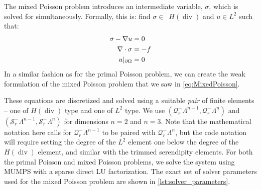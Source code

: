\documentclass[format=acmsmall,screen,timestamp=false,a4paper]{acmart}
\DeclareMathOperator{\Div}{div}
\newcommand{\calQ}{\mathcal{Q}}
\newcommand{\calS}{\mathcal{S}}
\newcommand{\hdiv}{\ensuremath{{H}(\Div)}\xspace}
\begin{document}
The mixed Poisson problem introduces an intermediate variable, $\sigma$, which is solved for simultaneously.
Formally, this is: find $\sigma\in$~\hdiv and $u\in L^2$ such that:
\begin{align}
     \sigma - \nabla u &= 0 \notag \\
     \nabla \cdot \sigma &= -f \notag \\
     u\vert_{\partial \Omega} &= 0 \notag
\end{align}
In a similar fashion as for the primal Poisson problem, we can create the weak formulation of the mixed Poisson problem that we saw in \cref{eq:MixedPoisson}.  %

These equations are discretized and solved using a suitable \textit{pair} of finite elements -- one of \hdiv type and one of $L^2$ type.  We use $(\calQ_r^-\Lambda^{n-1},\calQ_r^-\Lambda^n)$ and $(\calS_r^-\Lambda^{n-1},\calS_r^-\Lambda^n)$ for dimensions $n=2$ and $n=3$.  Note that the mathematical notation here calls for $\mathcal{Q}^-_r \Lambda^{n-1}$ to be paired with $\mathcal{Q}^-_r \Lambda^n$, but the code notation will require setting the degree of the $L^2$ element one below the degree of the \hdiv element, and similar with the trimmed serendipity elements.
For both the primal Poisson and mixed Poisson problems, we solve the system using MUMPS with a sparse direct LU factorization.
The exact set of solver parameters used for the mixed Poisson problem are shown in \cref{lst:solver_parameters}.
\end{document}
